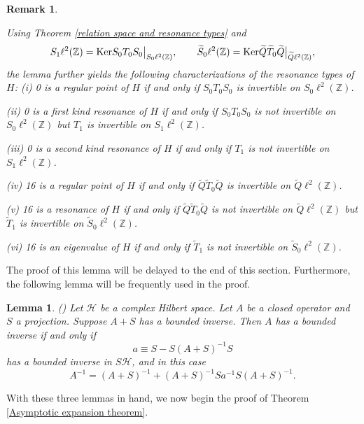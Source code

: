 \documentclass[reqno, 11pt]{amsart}
\newtheorem{lemma}[definition]{Lemma}
\newtheorem{remark}[definition]{Remark}
\newcommand\Z{\mathbb{Z}}
\newcommand\mscH{\mathcal{H}}
\numberwithin{equation}{section}
\begin{document}
\begin{remark}\label{remark of charac from inverti of operators}
{\rm Using Theorem \ref{relation space and resonance types} and 
$$S_1\ell^2(\Z)={\rm Ker}S_0T_0S_0\big|_{S_0\ell^2(\Z)},\qquad \widetilde{S}_0\ell^2(\Z)={\rm Ker}\widetilde{Q}\widetilde{T}_0\widetilde{Q}\big|_{\widetilde{Q}\ell^2(\Z)},$$
the lemma further yields the following characterizations of the resonance types of $H$:
\vskip0.1cm
(i) 0 is a regular point of $H$ if and only if $S_0T_0S_0$ is invertible on $S_0\ell^2(\Z)$.

(ii) 0 is a first kind resonance of $H$ if and only if $S_0T_0S_0$ is not invertible on $S_0\ell^2(\Z)$ but $T_1$ is invertible on $S_1\ell^2(\Z)$.

(iii) 0 is a second kind resonance of $H$ if and only if $T_1$ is not invertible on $S_1\ell^2(\Z)$.

(iv) 16 is a regular point of $H$ if and only if $\widetilde{Q}\widetilde{T}_0\widetilde{Q}$ is invertible on $\widetilde{Q}\ell^2(\Z)$.

(v) 16 is a resonance of $H$ if and only if $\widetilde{Q}\widetilde{T}_0\widetilde{Q}$ is not invertible on $\widetilde{Q}\ell^2(\Z)$ but $\widetilde{T}_1$ is invertible on $\widetilde{S}_0\ell^2(\Z)$.

(vi) 16 is an eigenvalue of $H$ if and only if $\widetilde{T}_1$ is not invertible on $\widetilde{S}_0\ell^2(\Z)$.
}
\end{remark}
The proof of this lemma will be delayed to the end of this section. Furthermore, the following lemma will be frequently used in the proof.
\begin{lemma}\label{lemm of expa}
{\rm (\cite[Lemma 2.1]{JN01})} Let $\mscH$ be a complex Hilbert space. Let $A$ be a closed operator and $S$ a projection. Suppose $A+S$ has a bounded inverse. Then $A$ has a bounded inverse if and only if
$$a\equiv S-S(A+S)^{-1}S$$
has a bounded inverse in $S\mscH$, and in this case
$$A^{-1}=(A+S)^{-1}+(A+S)^{-1}Sa^{-1}S(A+S)^{-1}.$$
\end{lemma}
With these three lemmas in hand, we now begin the proof of Theorem \ref{Asymptotic expansion theorem}.
\end{document}
